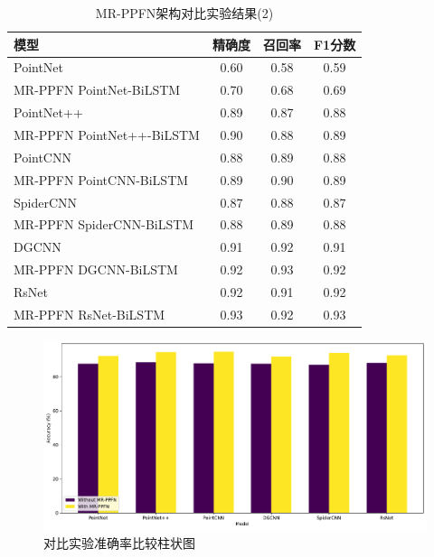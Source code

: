 \begin{table}[htbp]
    \centering
    \caption{MR-PPFN架构对比实验结果(2)}
    \label{tab:MR-PPFN compare res 2}
    \begin{tabular}{lccc}
        \toprule
        \textbf{模型} & \textbf{精确度} & \textbf{召回率} & \textbf{F1分数} \\
        \midrule
        PointNet & 0.60 & 0.58 & 0.59 \\
        MR-PPFN PointNet-BiLSTM & 0.70 & 0.68 & 0.69 \\
        PointNet++ & 0.89 & 0.87 & 0.88 \\
        MR-PPFN PointNet++-BiLSTM & 0.90 & 0.88 & 0.89 \\
        PointCNN & 0.88 & 0.89 & 0.88 \\
        MR-PPFN PointCNN-BiLSTM & 0.89 & 0.90 & 0.89 \\
        SpiderCNN & 0.87 & 0.88 & 0.87 \\
        MR-PPFN SpiderCNN-BiLSTM & 0.88 & 0.89 & 0.88 \\
        DGCNN & 0.91 & 0.92 & 0.91 \\
        MR-PPFN DGCNN-BiLSTM & 0.92 & 0.93 & 0.92 \\
        RsNet & 0.92 & 0.91 & 0.92 \\
        MR-PPFN RsNet-BiLSTM & 0.93 & 0.92 & 0.93 \\
        \bottomrule
    \end{tabular}
\end{table}

\begin{figure}[htbp]
    \centering
    \includegraphics[width=1\linewidth]{imgs/MR-PPFN_accuracy_comparison.pdf}
    \caption{对比实验准确率比较柱状图}
    \label{fig:MR-PPFN_accuracy_comparison}
\end{figure}
 

